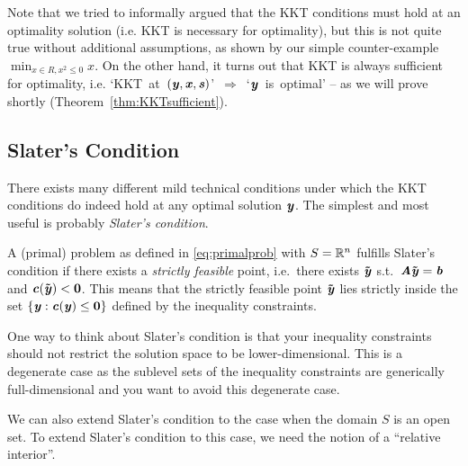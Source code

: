 Note that we tried to informally argued that the KKT conditions must
hold at an optimality solution (i.e. KKT is necessary for optimality),
but this is not quite true without additional assumptions, as shown by
our simple counter-example $\min_{x \in R, x^2 \leq 0} x$.
On the other hand, it turns out that KKT is always sufficient for
optimality,
i.e. \mbox{`KKT at $(\boldsymbol{\mathit{y}}, \boldsymbol{\mathit{x}}, \boldsymbol{\mathit{s}})$' $\Rightarrow$ `$\boldsymbol{\mathit{y}}$ is optimal'}
-- as
we will prove shortly (Theorem~\ref{thm:KKTsufficient}).

\subsection{Slater's Condition}
There exists many different mild technical conditions under which the
KKT conditions do indeed hold at any optimal solution $\boldsymbol{\mathit{y}}$.
The simplest and most useful is probably \emph{Slater's condition}.

\begin{definition} \label{def:slater}
A (primal) problem as defined in \eqref{eq:primalprob} with $S = \mathbb{R}^n$ fulfills
Slater's condition if there exists a \emph{strictly feasible} point,
i.e.\ there exists $\boldsymbol{\tilde{\mathit{y}}}$ s.t.\ $\boldsymbol{\mathit{A}}\boldsymbol{\tilde{\mathit{y}}} = \boldsymbol{\mathit{b}}$ and $\boldsymbol{\mathit{c}}(\boldsymbol{\tilde{\mathit{y}}}) <
\boldsymbol{0}$.
This means that the strictly feasible point $\boldsymbol{\tilde{\mathit{y}}}$ lies strictly inside the set $\{\boldsymbol{\mathit{y}} : \boldsymbol{\mathit{c}}(\boldsymbol{\mathit{y}}) \leq \boldsymbol{0}\}$ defined by the inequality constraints.
\end{definition}

One way to think about Slater's condition is that your inequality
constraints should not restrict the solution space to be
lower-dimensional. This is a degenerate case as the sublevel sets of
the inequality constraints are generically full-dimensional and you
want to avoid this degenerate case.

We can also extend Slater's condition to the case when the domain $S$
is an open set.
To extend Slater's condition to this case, we need the notion of a ``relative interior''.


